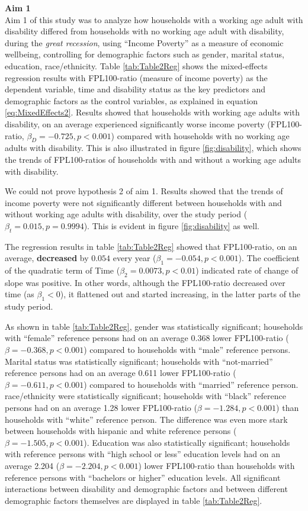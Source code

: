 \documentclass[11pt]{extarticle} %
\begin{document}
\noindent
{\bf{Aim 1}}\\
Aim 1 of this study was to analyze how households with a working age adult with disability differed from households with no working age adult with disability, during the {\emph{great recession}}, using ``Income Poverty'' as a measure of economic wellbeing, controlling for demographic factors such as gender, marital status, education, race/ethnicity. Table \ref{tab:Table2Reg} shows the mixed-effects regression results with FPL100-ratio (measure of income poverty) as the dependent variable, time and disability status as the key predictors and demographic factors as the control variables, as explained in equation \ref{eq:MixedEffects2}. Results showed that households with working age adults with disability, on an average experienced significantly worse income poverty (FPL100-ratio, $\beta_D = -0.725, p < 0.001$) compared with households with no working age adults with disability. This is also illustrated in figure \ref{fig:disability}, which shows the trends of FPL100-ratios of households with and without a working age adults with disability. 

We could not prove hypothesis 2 of aim 1. Results showed that the trends of income poverty were not significantly different between households with and without working age adults with disability, over the study period ($\beta_t = 0.015, p = 0.9994$). This is evident in figure \ref{fig:disability} as well. 

The regression results in table \ref{tab:Table2Reg} showed that FPL100-ratio, on an average, {\bf{decreased}} by $0.054$ every year ($\beta_1 = -0.054, p < 0.001$). The coefficient of the quadratic term of Time ($\beta_2 = 0.0073, p < 0.01$) indicated rate of change of slope was positive. In other words, although the FPL100-ratio decreased over time (as $\beta_1 < 0$), it flattened out and started increasing, in the latter parts of the study period. 

As shown in table \ref{tab:Table2Reg}, gender was statistically significant; households with ``female'' reference persons had on an average 0.368 lower FPL100-ratio ($\beta = -0.368, p < 0.001$) compared to households with ``male'' reference persons. Marital status was statistically significant; households with ``not-married'' reference persons had on an average 0.611 lower FPL100-ratio ($\beta = -0.611, p < 0.001$) compared to households with ``married'' reference person. race/ethnicity were statistically significant; households with ``black'' reference persons had on an average 1.28 lower FPL100-ratio ($\beta = -1.284, p < 0.001$) than households with ``white'' reference person. The difference was even more stark between households with hispanic and white reference persons ($\beta = -1.505, p < 0.001$). Education was also statistically significant; households with reference persons with ``high school or less'' education levels had on an average 2.204 ($\beta = -2.204, p < 0.001$) lower FPL100-ratio than households with reference persons with ``bachelors or higher'' education levels. All significant interactions between disability and demographic factors and between different demographic factors themselves are displayed in table \ref{tab:Table2Reg}.
\end{document}

